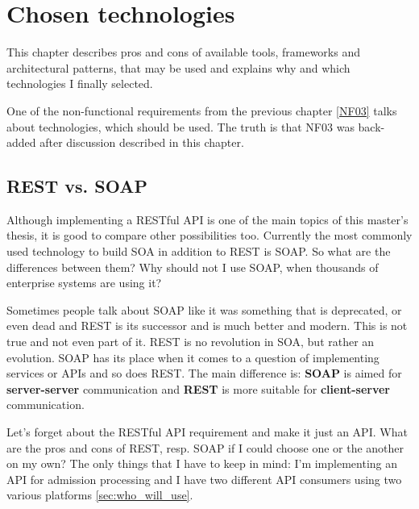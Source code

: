 \chapter{Chosen technologies}\label{technologies}

	This chapter describes pros and cons of available tools, frameworks and architectural patterns, that may be used and
	explains why and which technologies I finally selected.
	
	One of the non-functional requirements from the previous chapter \ref{NF03} talks about technologies, which should be
	used. The truth is that NF03 was back-added after discussion described in this chapter.

	\section{REST vs. SOAP}
	
	Although implementing a RESTful API is one of the main topics of this master's thesis, it is good to compare other
	possibilities too. Currently the most commonly used technology to build SOA in addition to REST is SOAP. So what are
	the differences between them? Why should not I use SOAP, when thousands of enterprise systems are using it?
	
	Sometimes people talk about SOAP like it was something that is deprecated, or even dead and REST is its successor and
	is much better and modern. This is not true and not even part of it. REST is no revolution in SOA, but rather
	an evolution. SOAP has its place when it comes to a question of implementing services or APIs and so does REST. The
	main difference is: \textbf{SOAP} is aimed for \textbf{server-server} communication and \textbf{REST} is more suitable
	for \textbf{client-server} communication.
	
	Let's forget about the RESTful API requirement and make it just an API. What are the pros and cons of REST, resp. SOAP
	if I could choose one or the another on my own? The only things that I have to keep in mind: I'm implementing an API
	for admission processing and I have two different API consumers using two various platforms \ref{sec:who_will_use}.
	
